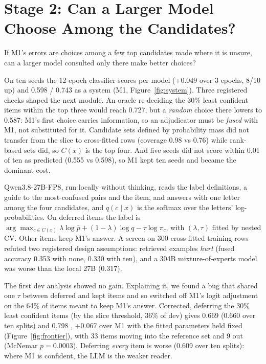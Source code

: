 \section{Stage 2: Can a Larger Model Choose Among the Candidates?}
\label{sec:cascade}
\FigureFrontier

If M1's errors are choices among a few top candidates made where it is unsure, can a larger model consulted only there make better choices?

On ten seeds the 12-epoch classifier scores  per model (+0.049 over 3 epochs, 8/10 up) and 0.598 \Stwo{} / 0.743 \Sone{} as a system (M1, Figure~\ref{fig:system}).
Three registered checks shaped the next module.
An oracle re-deciding the 30\% least confident items within the top three would reach 0.727, but a \emph{random} choice there lowers \Stwo{} to 0.587: M1's first choice carries information, so an adjudicator must be \emph{fused} with M1, not substituted for it.
Candidate sets defined by probability mass did not transfer from the slice to cross-fitted rows (coverage 0.98 vs 0.76) while rank-based sets did, so $C(x)$ is the top four.
And five seeds did not score within 0.01 of ten as predicted (0.555 vs 0.598), so M1 kept ten seeds and became the dominant cost.

Qwen3.8-27B-FP8, run locally without thinking, reads the label definitions, a guide to the most-confused pairs and the item, and answers with one letter among the four candidates, and $q(c \mid x)$ is the softmax over the letters' log-probabilities.
On deferred items the label is $\arg\max_{c \in C(x)} \lambda \log \bar p + (1-\lambda) \log q - \tau \log \pi_c$, with $(\lambda, \tau)$ fitted by nested CV. Other items keep M1's answer.
A screen on 300 cross-fitted training rows refuted two registered design assumptions: retrieved examples \emph{hurt} (fused accuracy 0.353 with none, 0.330 with ten), and a 304B mixture-of-experts model was worse than the local 27B (0.317).

The first dev analysis showed no gain. Explaining it, we found a bug that shared one $\tau$ between deferred and kept items and so switched off M1's logit adjustment on the 64\% of items meant to keep M1's answer.
Corrected, deferring the 30\% least confident items (by the slice threshold, 36\% of dev) gives 0.669 \Stwo{} (0.660 over ten splits) and 0.798 \Sone{}, +0.067  over M1 with the fitted parameters held fixed (Figure~\ref{fig:frontier}), with 33 items moving into the reference set and 9 out (McNemar $p = 0.0003$).
Deferring \emph{every} item is worse (0.609 over ten splits): where M1 is confident, the LLM is the weaker reader.

